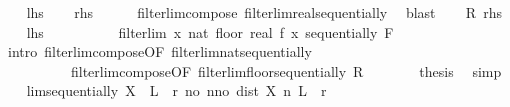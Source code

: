 \begin{isabellebody}
%
\isadelimproof
%
\endisadelimproof
%
\isatagproof
{}\isamarkupfalse%
\isanewline
\ \ \isamarkupfalse%
\ {\isacharquery}{\kern0pt}lhs\ \isamarkupfalse%
\ \isamarkupfalse%
\ {\isacharquery}{\kern0pt}rhs\isanewline
\ \ \ \ \isamarkupfalse%
\ filterlim{\isacharunderscore}{\kern0pt}compose\ filterlim{\isacharunderscore}{\kern0pt}real{\isacharunderscore}{\kern0pt}sequentially\ \isamarkupfalse%
\ blast\isanewline
{}\isamarkupfalse%
\isanewline
\ \ \isamarkupfalse%
\ R{\isacharcolon}{\kern0pt}\ {\isacharquery}{\kern0pt}rhs\isanewline
\ \ \isamarkupfalse%
\ {\isacharquery}{\kern0pt}lhs\isanewline
\ \ \isamarkupfalse%
\ {\isacharminus}{\kern0pt}\isanewline
\ \ \ \ \isamarkupfalse%
\ {\isachardoublequoteopen}filterlim\ {\isacharparenleft}{\kern0pt}{\isasymlambda}x{\isachardot}{\kern0pt}\ nat\ {\isacharparenleft}{\kern0pt}floor\ {\isacharparenleft}{\kern0pt}real\ {\isacharparenleft}{\kern0pt}f\ x{\isacharparenright}{\kern0pt}{\isacharparenright}{\kern0pt}{\isacharparenright}{\kern0pt}{\isacharparenright}{\kern0pt}\ sequentially\ F{\isachardoublequoteclose}\isanewline
\ \ \ \ \ \ \isamarkupfalse%
\ {\isacharparenleft}{\kern0pt}intro\ filterlim{\isacharunderscore}{\kern0pt}compose{\isacharbrackleft}{\kern0pt}OF\ filterlim{\isacharunderscore}{\kern0pt}nat{\isacharunderscore}{\kern0pt}sequentially{\isacharbrackright}{\kern0pt}\isanewline
\ \ \ \ \ \ \ \ \ \ filterlim{\isacharunderscore}{\kern0pt}compose{\isacharbrackleft}{\kern0pt}OF\ filterlim{\isacharunderscore}{\kern0pt}floor{\isacharunderscore}{\kern0pt}sequentially{\isacharbrackright}{\kern0pt}\ R{\isacharparenright}{\kern0pt}\isanewline
\ \ \ \ \isamarkupfalse%
\ \isamarkupfalse%
\ {\isacharquery}{\kern0pt}thesis\ \isamarkupfalse%
\ simp\isanewline
\ \ \isamarkupfalse%
\isanewline
{}\isamarkupfalse%
%
\endisatagproof
{\isafoldproof}%
%
\isadelimproof
%
\endisadelimproof
%
\isadelimdocument
%
\endisadelimdocument
%
\isatagdocument
%
\isamarkuptrue%
%
\endisatagdocument
{\isafolddocument}%
%
\isadelimdocument
%
\endisadelimdocument
{}\isamarkupfalse%
\ lim{\isacharunderscore}{\kern0pt}sequentially{\isacharcolon}{\kern0pt}\ {\isachardoublequoteopen}X\ {\isasymlonglonglongrightarrow}\ L\ {\isasymlongleftrightarrow}\ {\isacharparenleft}{\kern0pt}{\isasymforall}r{\isachargreater}{\kern0pt}{}{\isachardot}{\kern0pt}\ {\isasymexists}no{\isachardot}{\kern0pt}\ {\isasymforall}n{\isasymge}no{\isachardot}{\kern0pt}\ dist\ {\isacharparenleft}{\kern0pt}X\ n{\isacharparenright}{\kern0pt}\ L\ {\isacharless}{\kern0pt}\ r{\isacharparenright}{\kern0pt}{\isachardoublequoteclose}\isanewline

\end{isabellebody}
